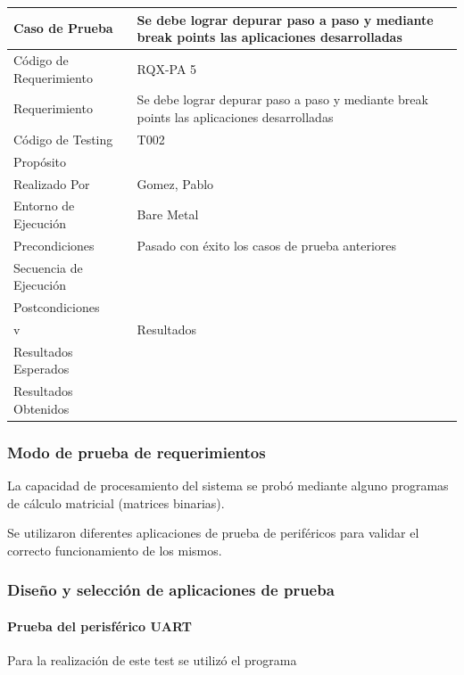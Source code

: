 \begin{table}[!h]
		\centering
		\begin{tabular}{ p{5cm} p{10cm}  }
		\hline 
	\rowcolor[gray]{0.8}  Caso de Prueba&  Se debe lograr depurar paso a paso y mediante break points las aplicaciones desarrolladas\\
		\hline 
		Código de Requerimiento & RQX-PA 5\\ 
		\hline 
		Requerimiento  &  Se debe lograr depurar paso a paso y mediante break points las aplicaciones desarrolladas\\ 
		\hline 
		Código de Testing & T002\\ 
		\hline
		Propósito &  \\
		\hline
		Realizado Por & Gomez, Pablo \\
		\hline	
		Entorno de Ejecución & Bare Metal \\
		\hline
		Precondiciones & Pasado con éxito los casos de prueba anteriores \\
		\hline
		Secuencia de Ejecución &  \\
		\hline
		Postcondiciones & \\
		\hline
		\rowcolor[gray]{0.8}  v&Resultados\\
		\hline
		Resultados Esperados & \\
		\hline	
		Resultados Obtenidos & \\
		\hline
		\end{tabular}
		\end{table}

\newpage


		\subsubsection{Modo de prueba de requerimientos}
		La capacidad de procesamiento del sistema se probó mediante alguno programas de cálculo matricial (matrices binarias).  
		
		Se utilizaron diferentes aplicaciones de prueba de periféricos para validar el correcto funcionamiento de los mismos. 
		
		\subsubsection{Diseño y selección de aplicaciones de prueba}
		\paragraph{Prueba del perisférico UART}
		Para la realización de este test se utilizó el programa 
		
